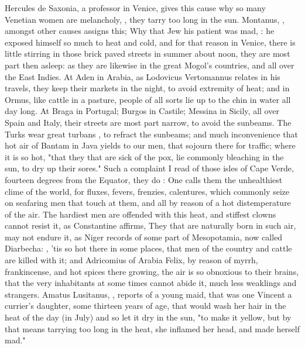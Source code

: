Hercules de Saxonia, a professor in Venice, gives this
cause why so many Venetian women are melancholy, ,
they tarry too long in the sun. Montanus, ,
amongst other causes assigns this; Why that Jew his patient was mad, : he exposed himself so much to heat
and cold, and for that reason in Venice, there is little stirring in those
brick paved streets in summer about noon, they are most part then asleep: as
they are likewise in the great Mogol's countries, and all over the East Indies.
At Aden in Arabia, as Lodovicus Vertomannus relates in his
travels, they keep their markets in the night, to avoid extremity of heat; and
in Ormus, like cattle in a pasture, people of all sorts lie up to the chin in
water all day long. At Braga in Portugal; Burgos in Castile; Messina in Sicily,
all over Spain and Italy, their streets are most part narrow, to avoid the
sunbeams. The Turks wear great turbans , to
refract the sunbeams; and much inconvenience that hot air of Bantam in Java
yields to our men, that sojourn there for traffic; where it is so hot,
"that they that are sick of the pox, lie commonly
bleaching in the sun, to dry up their sores." Such a complaint I read of those
isles of Cape Verde, fourteen degrees from the Equator, they do : One calls them the unhealthiest clime of the
world, for fluxes, fevers, frenzies, calentures, which commonly seize on
seafaring men that touch at them, and all by reason of a hot distemperature of
the air. The hardiest men are offended with this heat, and stiffest clowns
cannot resist it, as Constantine affirms,  They that are naturally born in such air, may not
endure it, as Niger records of some part of Mesopotamia,
now called Diarbecha: , 'tis so hot
there in some places, that men of the country and cattle are killed with it;
and Adricomius of Arabia Felix, by reason of myrrh,
frankincense, and hot spices there growing, the air is so obnoxious to their
brains, that the very inhabitants at some times cannot abide it, much less
weaklings and strangers. Amatus Lusitanus,
, reports of a young maid, that was
one Vincent a currier's daughter, some thirteen years of age, that would wash
her hair in the heat of the day (in July) and so let it dry in the sun,
"to make it yellow, but by that means tarrying too long in
the heat, she inflamed her head, and made herself mad."

